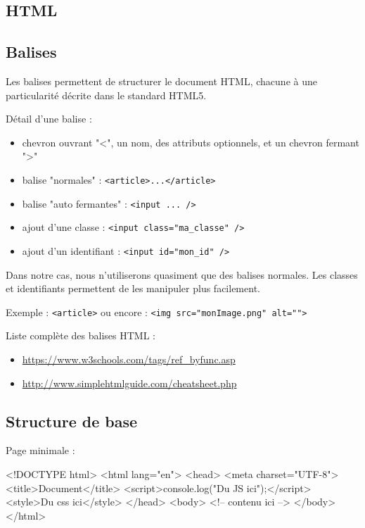 \documentclass[10pt, landscape, french]{article}
\newcommand{\codeHTMLinline}[2] {
	#1 : \texttt{#2}
  }
\newenvironment{codeHTML}[1]{%
#1 :  %
\minted{HTML}%
}{%
\endminted%
}
\begin{document}
\begin{multicols}{3}
		\section{HTML}

\subsection{Balises}

Les balises permettent de structurer le document HTML, chacune à une particularité décrite dans le standard HTML5. 

Détail d'une balise :
\begin{itemize}
\item chevron ouvrant "<", un nom, des attributs optionnels, et un chevron fermant ">"
\item balise \codeHTMLinline{"normales"}{<article>...</article>}
\item balise \codeHTMLinline{"auto fermantes"}{<input ... />}
\item \codeHTMLinline{ajout d'une classe}{<input class="ma_classe" />}
\item \codeHTMLinline{ajout d'un identifiant}{<input id="mon_id" />}
\end{itemize}

Dans notre cas, nous n'utiliserons quasiment que des balises normales. Les classes et identifiants permettent de les manipuler plus facilement. 

\codeHTMLinline{Exemple}{<article>} ou \codeHTMLinline{encore}{<img src="monImage.png" alt="">}


Liste complète des balises HTML :
\begin{itemize}
	\item \url{https://www.w3schools.com/tags/ref_byfunc.asp}
	\item \url{http://www.simplehtmlguide.com/cheatsheet.php}
\end{itemize}

\subsection{Structure de base}
\begin{codeHTML}{Page minimale}
<!DOCTYPE html>
<html lang="en">
<head>
	<meta charset="UTF-8">
	<title>Document</title>
	<script>console.log("Du JS ici");</script>
	<style>Du css ici</style>
</head>
<body>
	<!-- contenu ici -->
</body>
</html>
\end{codeHTML}



\end{multicols}
\end{document}
